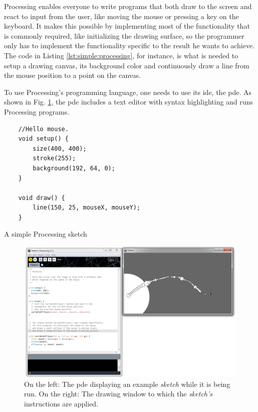 Processing enables everyone to write programs that both draw to the screen and react to input from the user, like moving the mouse or pressing a key on the keyboard.
It makes this possible by implementing most of the functionality that is commonly required, like initializing the drawing surface, so the programmer only has to implement the functionality specific to the result he wants to achieve.
The code in Listing \ref{lst:simple:processing}, for instance, is what is needed to setup a drawing canvas, its background color and continuously draw a line from the mouse position to a point on the canvas.

To use Processing's programming language, one needs to use its \gls{ide}, the \acrfull{pde}.
As shown in Fig. \ref{fig:proc:dev:env}, the \gls{pde} includes a text editor with syntax highlighting and runs Processing programs.

\begin{listing}
	\begin{verbatim}
	//Hello mouse.
	void setup() {
		size(400, 400);
		stroke(255);
		background(192, 64, 0);
	}

	void draw() {
		line(150, 25, mouseX, mouseY);
	}
	\end{verbatim}
	\caption[A simple Processing sketch]{A simple Processing sketch}
	\label{lst:simple:processing}
\end{listing}

\begin{figure}
	\centering
	\includegraphics[width=1.0\textwidth]{images/proc_dev_env}
	\caption{On the left: The \gls{pde} displaying an example \emph{sketch} while it is being run. On the right: The drawing window to which the \emph{sketch's} instructions are applied.}
	\label{fig:proc:dev:env}
\end{figure}



